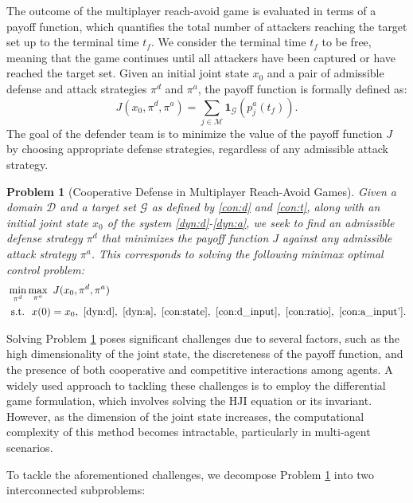 \documentclass[journal]{IEEEtran}
\newtheorem{Problem}{\bf Problem}
\newcommand{\D}{\mathcal{D}}
\newcommand{\G}{\mathcal{G}}
\newcommand{\M}{\mathcal{M}}
\newcommand{\1}{\mathbf{1}}
\begin{document}
The outcome of the multiplayer reach-avoid game is evaluated in terms of a payoff function, which quantifies the total number of attackers reaching the target set up to the terminal time $t_f$. We consider the terminal time $t_f$ to be free, meaning that the game continues until all attackers have been captured or have reached the target set. Given an initial joint state $x_0$ and a pair of admissible defense and attack strategies $\pi^d$ and $\pi^a$, the payoff function is formally defined as:
\begin{equation}\label{payoff}
    J(x_0,\pi^d,\pi^a)=\sum_{j\in \M}\1_{\G}(p^a_j(t_f)).
\end{equation}
The goal of the defender team is to minimize the value of the payoff function $J$ by choosing appropriate defense strategies, regardless of any admissible attack strategy.

\begin{Problem}[Cooperative Defense in Multiplayer Reach-Avoid Games]\label{pb}
Given a domain $\D$ and a target set $\G$ as defined by \eqref{con:d} and \eqref{con:t}, along with an initial joint state $x_0$ of the system \eqref{dyn:d}-\eqref{dyn:a}, we seek to find an admissible defense strategy $\pi^d$ that minimizes the payoff function $J$ against any admissible attack strategy $\pi^a$. This corresponds to solving the following minimax optimal control problem:
\begin{equation*}
	\begin{split}
        &\min_{\pi^d}\max_{\pi^a}~J(x_0,\pi^d,\pi^a)\\
        &~\mathrm{s.t.}~~x(0)=x_0,~\eqref{dyn:d},~\eqref{dyn:a},~\eqref{con:state},~\eqref{con:d_input},~\eqref{con:ratio},~\eqref{con:a_input'}.
	\end{split}
\end{equation*}
\end{Problem}

Solving Problem \ref{pb} poses significant challenges due to several factors, such as the high dimensionality of the joint state, the discreteness of the payoff function, and the presence of both cooperative and competitive interactions among agents. A widely used approach to tackling these challenges is to employ the differential game formulation, which involves solving the HJI equation or its invariant. However, as the dimension of the joint state increases, the computational complexity of this method becomes intractable, particularly in multi-agent scenarios.

To tackle the aforementioned challenges, we decompose Problem \ref{pb} into two interconnected subproblems:
\end{document}
